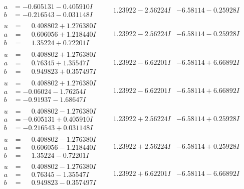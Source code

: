\documentclass[1p]{elsarticle_modified}
\theoremstyle{definition}
\begin{document}
$$\begin{array}{c|c|c}
\begin{aligned}
a &= -0.605131 - 0.405910 I \\
b &= -0.216543 - 0.031148 I\end{aligned}
 & \phantom{-}1.23922 - 2.56224 I & -6.58114 - 0.25928 I \\ \hline\begin{aligned}
u &= \phantom{-}0.408802 + 1.276380 I \\
a &= \phantom{-}0.606056 + 1.218440 I \\
b &= \phantom{-}1.35224 + 0.72201 I\end{aligned}
 & \phantom{-}1.23922 - 2.56224 I & -6.58114 - 0.25928 I \\ \hline\begin{aligned}
u &= \phantom{-}0.408802 + 1.276380 I \\
a &= \phantom{-}0.76345 + 1.35547 I \\
b &= \phantom{-}0.949823 + 0.357497 I\end{aligned}
 & \phantom{-}1.23922 - 6.62201 I & -6.58114 + 6.66892 I \\ \hline\begin{aligned}
u &= \phantom{-}0.408802 + 1.276380 I \\
a &= -0.06024 - 1.76254 I \\
b &= -0.91937 - 1.68647 I\end{aligned}
 & \phantom{-}1.23922 - 6.62201 I & -6.58114 + 6.66892 I \\ \hline\begin{aligned}
u &= \phantom{-}0.408802 - 1.276380 I \\
a &= -0.605131 + 0.405910 I \\
b &= -0.216543 + 0.031148 I\end{aligned}
 & \phantom{-}1.23922 + 2.56224 I & -6.58114 + 0.25928 I \\ \hline\begin{aligned}
u &= \phantom{-}0.408802 - 1.276380 I \\
a &= \phantom{-}0.606056 - 1.218440 I \\
b &= \phantom{-}1.35224 - 0.72201 I\end{aligned}
 & \phantom{-}1.23922 + 2.56224 I & -6.58114 + 0.25928 I \\ \hline\begin{aligned}
u &= \phantom{-}0.408802 - 1.276380 I \\
a &= \phantom{-}0.76345 - 1.35547 I \\
b &= \phantom{-}0.949823 - 0.357497 I\end{aligned}
 & \phantom{-}1.23922 + 6.62201 I & -6.58114 - 6.66892 I \\ \hline\begin{aligned}

\end{aligned}
\end{array}$$
\end{document}
